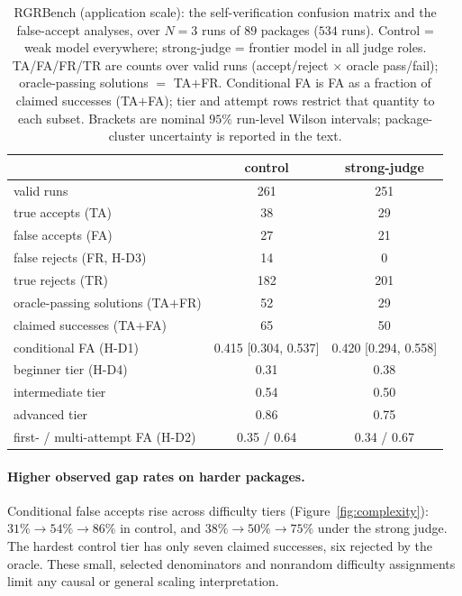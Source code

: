 \documentclass{article}
\begin{document}
\begin{table}[t]
\centering
\caption{RGRBench (application scale): the self-verification confusion matrix and the
false-accept analyses, over $N{=}3$ runs of $89$ packages ($534$ runs). Control = weak model
everywhere; strong-judge = frontier model in all judge roles. TA/FA/FR/TR are counts over
valid runs (accept/reject $\times$ oracle pass/fail); oracle-passing solutions $=$ TA${+}$FR.
Conditional FA is FA as a fraction of claimed successes (TA${+}$FA); tier and attempt rows
restrict that quantity to each subset. Brackets are nominal $95\%$ run-level Wilson
intervals; package-cluster uncertainty is reported in the text.}
\label{tab:scale}
\small
\begin{tabular}{lcc}
\toprule
 & control & strong-judge \\
\midrule
valid runs                           & 261 & 251 \\
true accepts (TA)                    & 38  & 29  \\
false accepts (FA)                   & 27  & 21  \\
false rejects (FR, H-D3)             & 14  & 0   \\
true rejects (TR)                    & 182 & 201 \\
oracle-passing solutions (TA${+}$FR) & 52  & 29  \\
\midrule
claimed successes (TA${+}$FA)        & 65 & 50 \\
conditional FA (H-D1) & 0.415 [0.304, 0.537] & 0.420 [0.294, 0.558] \\
\quad beginner tier (H-D4) & 0.31 & 0.38 \\
\quad intermediate tier & 0.54 & 0.50 \\
\quad advanced tier & 0.86 & 0.75 \\
first- / multi-attempt FA (H-D2) & 0.35 / 0.64 & 0.34 / 0.67 \\
\bottomrule
\end{tabular}
\end{table}

\paragraph{Higher observed gap rates on harder packages.} Conditional false accepts rise
across difficulty tiers (Figure~\ref{fig:complexity}): $31\% \to 54\% \to 86\%$ in control,
and $38\% \to 50\% \to 75\%$ under the strong judge. The hardest control tier has only seven
claimed successes, six rejected by the oracle. These small, selected denominators and
nonrandom difficulty assignments limit any causal or general scaling interpretation.
\end{document}
